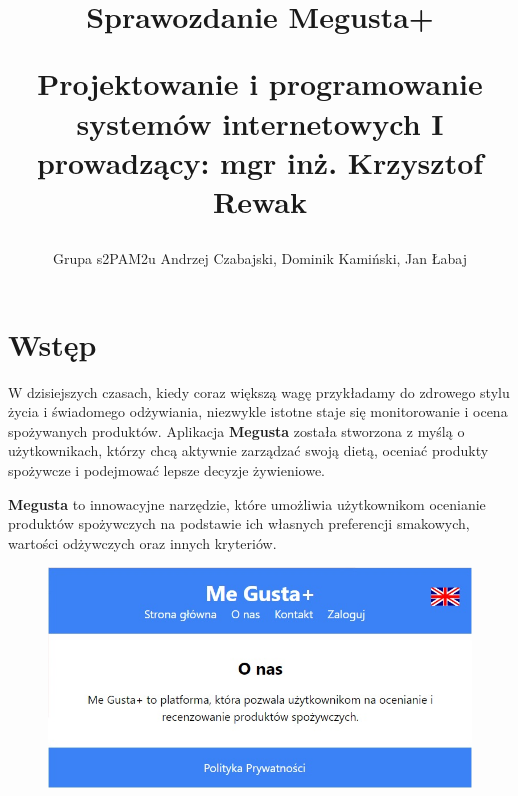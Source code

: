 \documentclass[a4paper,12pt]{report}
\title{Sprawozdanie Megusta+

\newline Projektowanie i programowanie \newline systemów internetowych I 
\newline prowadzący: mgr inż. Krzysztof Rewak
}
\author{Grupa s2PAM2u Andrzej Czabajski, Dominik Kamiński, Jan Łabaj}
\begin{document}
\maketitle

\tableofcontents

\chapter{Wstęp}

W dzisiejszych czasach, kiedy coraz większą wagę przykładamy do zdrowego stylu życia i świadomego odżywiania, niezwykle istotne staje się monitorowanie i ocena spożywanych produktów. Aplikacja \textbf{Megusta} została stworzona z myślą o użytkownikach, którzy chcą aktywnie zarządzać swoją dietą, oceniać produkty spożywcze i podejmować lepsze decyzje żywieniowe.

\textbf{Megusta} to innowacyjne narzędzie, które umożliwia użytkownikom ocenianie produktów spożywczych na podstawie ich własnych preferencji smakowych, wartości odżywczych oraz innych kryteriów.



\begin{figure}[h!]
    \centering
    \includegraphics[width=\textwidth]{00logo.jpg}
    
\end{figure}
\end{document}
